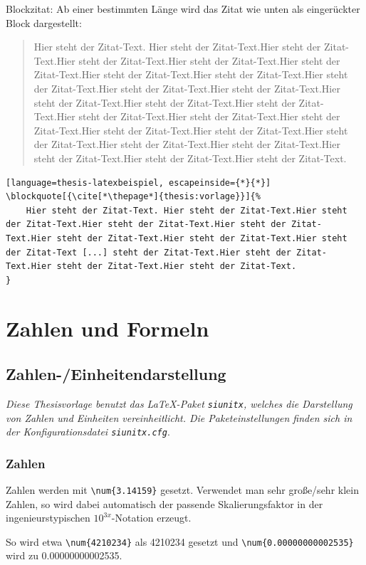 			\noindent
			Blockzitat: Ab einer bestimmten Länge wird das Zitat wie unten als eingerückter Block dargestellt:%
%			
			\begin{vorlagenbeispiel}
				\blockquote[{\cite[\thepage]{thesis:vorlage}}]{%
					Hier steht der Zitat-Text. Hier steht der Zitat-Text.Hier steht der Zitat-Text.Hier steht der Zitat-Text.Hier steht der Zitat-Text.Hier steht der Zitat-Text.Hier steht der Zitat-Text.Hier steht der Zitat-Text.Hier steht der Zitat-Text.Hier steht der Zitat-Text.Hier steht der Zitat-Text.Hier steht der Zitat-Text.Hier steht der Zitat-Text.Hier steht der Zitat-Text.Hier steht der Zitat-Text.Hier steht der Zitat-Text.Hier steht der Zitat-Text.Hier steht der Zitat-Text.Hier steht der Zitat-Text.Hier steht der Zitat-Text.Hier steht der Zitat-Text.Hier steht der Zitat-Text.Hier steht der Zitat-Text.Hier steht der Zitat-Text.Hier steht der Zitat-Text.
				}
			\end{vorlagenbeispiel}
			\begin{lstlisting}[language=thesis-latexbeispiel, escapeinside={*}{*}]
\blockquote[{\cite[*\thepage*]{thesis:vorlage}}]{%
	Hier steht der Zitat-Text. Hier steht der Zitat-Text.Hier steht der Zitat-Text.Hier steht der Zitat-Text.Hier steht der Zitat-Text.Hier steht der Zitat-Text.Hier steht der Zitat-Text.Hier steht der Zitat-Text [...] steht der Zitat-Text.Hier steht der Zitat-Text.Hier steht der Zitat-Text.Hier steht der Zitat-Text.
}
			\end{lstlisting}
		
	\section{Zahlen und Formeln}
		\subsection{Zahlen-/Einheitendarstellung}
			\emph{Diese Thesisvorlage benutzt das \LaTeX-Paket \lstinline|siunitx|, welches die Darstellung von Zahlen und Einheiten vereinheitlicht. Die Paketeinstellungen finden sich in der Konfigurationsdatei \lstinline|siunitx.cfg|}.
			
			\subsubsection{Zahlen}
				Zahlen werden mit \lstinline|\num{3.14159}| gesetzt.
				Verwendet man sehr große/sehr klein Zahlen, so wird dabei automatisch der passende Skalierungsfaktor in der ingenieurstypischen $10^{3x}$-Notation erzeugt.
				\begin{vorlagenbeispiel}
					So wird etwa \lstinline|\num{4210234}| als \num{4210234} gesetzt und \lstinline|\num{0.00000000002535}| wird zu \num{0.00000000002535}.
				\end{vorlagenbeispiel}
				\medskip
				
